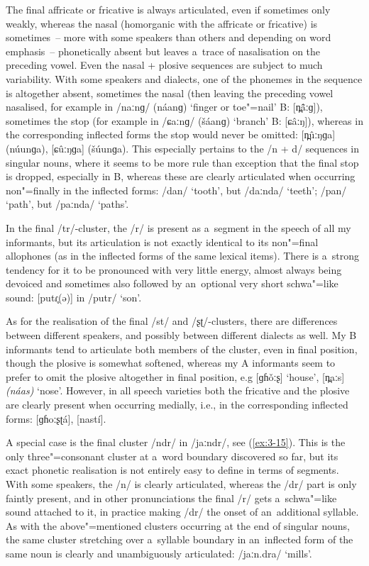 The final affricate or fricative is always articulated, even if sometimes only weakly, whereas the
nasal (homorganic with the affricate or fricative) is sometimes~-- more with some speakers than
others and depending on word emphasis~-- phonetically absent but leaves a~trace of nasalisation on
the preceding vowel. Even the nasal + plosive sequences are subject to much variability. With some
speakers and dialects, one of the phonemes in the sequence is altogether absent, sometimes the nasal
(then leaving the preceding vowel nasalised, for example in /naːnɡ/
(náanɡ) `finger or toe"=nail' B: [n̪\^{ã}ːɡ]), sometimes the stop (for example in /ɕaːnɡ/ (\v{s}áanɡ)
`branch' B: [ɕâːŋ]), whereas in the corresponding inflected forms the stop would never be
omitted: [n̪ûːŋɡa] (núunɡa), [ɕûːŋɡa]
(\v{s}úunɡa). This especially pertains to the /n +
d/ sequences in singular nouns, where it seems to be more rule than exception that the final stop is dropped, especially in B, whereas these are clearly articulated when occurring non"=finally in the inflected forms: /dan/ `tooth', but /daːnda/ `teeth'; /pan/ `path', but /paːnda/ `paths'.


In the final /tr/-cluster, the /r/ is present as a~segment in the speech of all my informants, but its articulation is not exactly identical to its non"=final allophones (as in the inflected forms of the same lexical items). There is a~strong tendency for it to be pronounced with very little energy, almost always being devoiced and sometimes also followed by an~optional very short schwa"=like sound: [putɾ̥(ə)] in /putr/ `son'. 


As for the realisation of the final /st/ and /ʂʈ/-clusters, there are differences between different speakers, and possibly between different dialects as well. My B informants tend to articulate both members of the cluster, even in final position, though the plosive is somewhat softened, whereas my A informants seem to prefer to omit the plosive altogether in final position, e.g [ɡɦ\v{o}ːʂ] `house', [n̪aːs] \textit{(náas)} `nose'. However, in all speech varieties both the fricative and the plosive are clearly present when occurring medially, i.e., in the corresponding inflected forms: [ɡɦoːʂʈá], [nastí].


A special case is the final cluster /ndr/ in /jaːndr/, see (\ref{ex:3-15}). This is the only three"=consonant cluster at a~word boundary discovered so far, but its exact phonetic realisation is not entirely easy to define in terms of segments. With some speakers, the /n/ is clearly articulated, whereas the /dr/ part is only faintly present, and in other pronunciations the final /r/ gets a~schwa"=like sound attached to it, in practice making /dr/ the onset of an~additional syllable. As with the above"=mentioned clusters occurring at the end of singular nouns, the same cluster stretching over a~syllable boundary in an~inflected form of the same noun is clearly and unambiguously articulated: /jaːn.dra/ `mills'.


